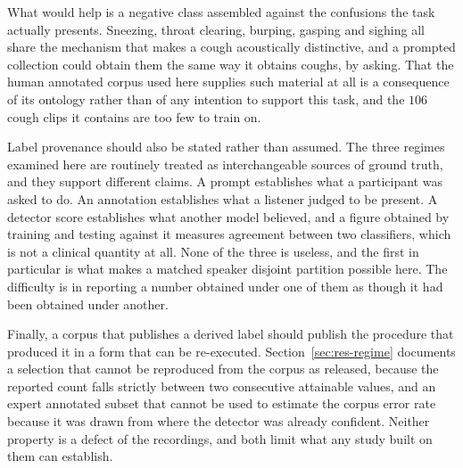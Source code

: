 What would help is a negative class assembled against the confusions the task actually
presents. Sneezing, throat clearing, burping, gasping and sighing all share the mechanism
that makes a cough acoustically distinctive, and a prompted collection could obtain them
the same way it obtains coughs, by asking. That the human annotated corpus used here
supplies such material at all is a consequence of its ontology rather than of any
intention to support this task, and the $106$ cough clips it contains are too few to
train on.

Label provenance should also be stated rather than assumed. The three regimes examined
here are routinely treated as interchangeable sources of ground truth, and they support
different claims. A prompt establishes what a participant was asked to do. An annotation
establishes what a listener judged to be present. A detector score establishes what
another model believed, and a figure obtained by training and testing against it measures
agreement between two classifiers, which is not a clinical quantity at all. None of the
three is useless, and the first in particular is what makes a matched speaker disjoint
partition possible here. The difficulty is in reporting a number obtained under one of
them as though it had been obtained under another.

Finally, a corpus that publishes a derived label should publish the procedure that
produced it in a form that can be re-executed. Section~\ref{sec:res-regime} documents a
selection that cannot be reproduced from the corpus as released, because the reported
count falls strictly between two consecutive attainable values, and an expert annotated
subset that cannot be used to estimate the corpus error rate because it was drawn from
where the detector was already confident. Neither property is a defect of the recordings,
and both limit what any study built on them can establish.
